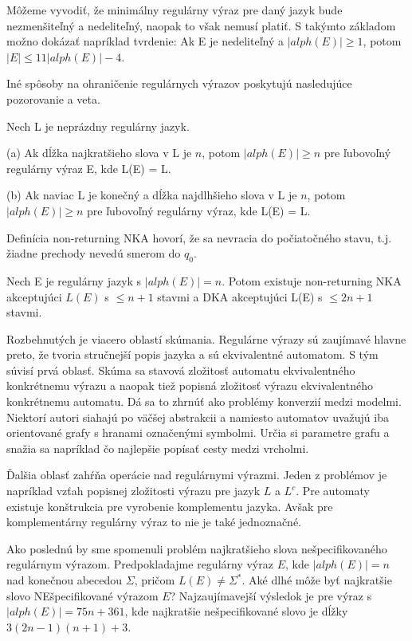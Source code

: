Môžeme vyvodiť, že minimálny regulárny výraz pre daný jazyk bude nezmenšiteľný a nedeliteľný, naopak to však nemusí platiť. S takýmto základom možno dokázať napríklad tvrdenie: Ak E je nedeliteľný a $|alph(E)| \geq 1$, potom $|E| \leq 11|alph(E)| - 4$.

Iné spôsoby na ohraničenie regulárnych výrazov poskytujú nasledujúce pozorovanie a veta.

\begin{veta}
Nech L je neprázdny regulárny jazyk.

(a) Ak dĺžka najkratšieho slova v L je $n$, potom $|alph(E)| \geq n$ pre ľubovoľný regulárny výraz E, kde L(E) = L.

(b) Ak naviac L je konečný a dĺžka najdlhšieho slova v L je $n$, potom $|alph(E)| \geq n$ pre ľubovoľný regulárny výraz, kde L(E) = L.
\end{veta}

Definícia non-returning NKA hovorí, že sa nevracia do počiatočného stavu, t.j. žiadne prechody nevedú smerom do $q_0$.

\begin{veta}[Theorem 10]
Nech E je regulárny jazyk s $|alph(E)| = n$. Potom existuje non-returning NKA akceptujúci $L(E)$ s $\leq n+1$ stavmi a DKA akceptujúci L(E) s $\leq 2n+1$ stavmi.
\end{veta}

Rozbehnutých je viacero oblastí skúmania. Regulárne výrazy sú zaujímavé hlavne preto, že tvoria stručnejší popis jazyka a sú ekvivalentné automatom. S tým súvisí prvá oblasť. Skúma sa stavová zložitosť automatu ekvivalentného konkrétnemu výrazu a naopak tiež popisná zložitosť výrazu ekvivalentného konkrétnemu automatu. Dá sa to zhrnúť ako problémy konverzií medzi modelmi. Niektorí autori siahajú po väčšej abstrakcii a namiesto automatov uvažujú iba orientované grafy s hranami označenými symbolmi. Určia si parametre grafu a snažia sa napríklad čo najlepšie popísať cesty medzi vrcholmi.

Ďalšia oblasť zahŕňa operácie nad regulárnymi výrazmi. Jeden z problémov je napríklad vzťah popisnej zložitosti výrazu pre jazyk $L$ a $L^c$. Pre automaty existuje konštrukcia pre vyrobenie komplementu jazyka. Avšak pre komplementárny regulárny výraz to nie je také jednoznačné.

Ako poslednú by sme spomenuli problém najkratšieho slova nešpecifikovaného re\-gu\-lár\-nym výrazom. Predpokladajme regulárny výraz $E$, kde $|alph(E)|=n$ nad konečnou abecedou $\Sigma$, pričom $L(E)\neq \Sigma^*$. Aké dlhé môže byť najkratšie slovo NEšpecifikované výrazom $E$? Najzaujímavejší výsledok je pre výraz s $|alph(E)| = 75n + 361$, kde naj\-krat\-šie nešpecifikované slovo je dĺžky $3(2 n - 1)(n + 1) + 3$.
